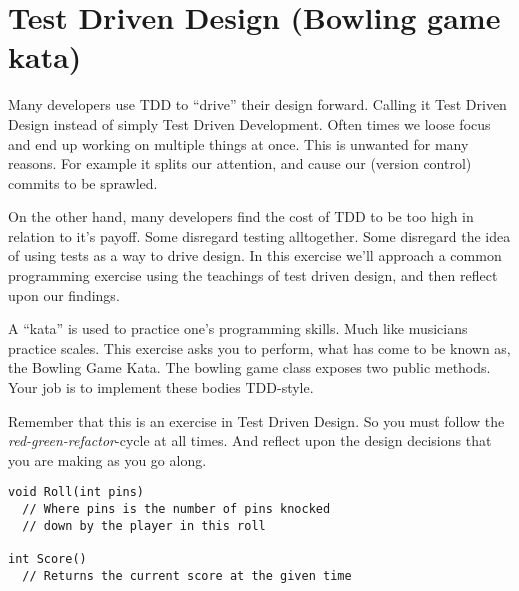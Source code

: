 \documentclass{article}
\begin{document}
\pagebreak
\section{ Test Driven Design (Bowling game kata)}
  Many developers use TDD to ``drive'' their design forward. Calling it Test Driven Design instead of simply Test Driven Development. Often times we loose focus and end up working on multiple things at once. This is unwanted for many reasons. For example it splits our attention, and cause our (version control) commits to be sprawled.

  On the other hand, many developers find the cost of TDD to be too high in relation to it's payoff. Some disregard testing alltogether. Some disregard the idea of using tests as a way to drive design. In this exercise we'll approach a common programming exercise using the teachings of test driven design, and then reflect upon our findings.

  A ``kata'' is used to practice one's programming skills. Much like musicians practice scales. This exercise asks you to perform, what has come to be known as, the Bowling Game Kata. The bowling game class exposes two public methods. Your job is to implement these bodies TDD-style.

  Remember that this is an exercise in Test Driven Design. So you must follow the \emph{red-green-refactor}-cycle at all times. And reflect upon the design decisions that you are making as you go along.

    \begin{lstlisting}
void Roll(int pins)
  // Where pins is the number of pins knocked
  // down by the player in this roll

int Score()
  // Returns the current score at the given time
    \end{lstlisting}
\end{document}
